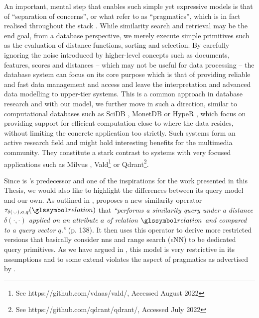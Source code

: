 An important, mental step that enables such simple yet expressive models is that of ``separation of concerns'', or what \cite{Giangreco:2018Database,Ferro:2014Bridging} refer to as ``pragmatics'', which is in fact realised throughout the \vitrivr{} stack \cite{Rossetto:2016Vitrivr,Gasser:2019Multimodal}. While similarity search and retrieval may be the end goal, from a database perspective, we merely execute simple primitives such as the evaluation of distance functions, sorting and selection. By carefully ignoring the noise introduced by higher-level concepts such as documents, features, scores and distances -- which may not be useful for data processing -- the database system can focus on its core purpose which is that of providing reliable and fast data management and access and leave the interpretation and advanced data modelling to upper-tier systems. This is a common approach in database research and with our model, we further move in such a direction, similar to computational databases such as SciDB \cite{Stonebraker:2013SciDB}, MonetDB \cite{Idreos:2012MonetDB} or HypeR \cite{Hubig:2017HyPerInsight}, which focus on providing support for efficient computation close to where the data resides, without limiting the concrete application too strictly. Such systems form an active research field \cite{Luo:2018Scalable,Blacher:2022Machine} and might hold interesting benefits for the multimedia community. They constitute a stark contrast to systems with very focused applications such as Milvus \cite{Wang:2021Milvus}, Vald\footnote{See https://github.com/vdaas/vald/, Accessed August 2022} or Qdrant\footnote{See https://github.com/qdrant/qdrant/, Accessed July 2022}.

Since \adampro \cite{Giangreco:2016Adam} is \cottontail{}'s predecessor and one of the inspirations for the work presented in this Thesis, we would also like to highlight the differences between its query model and our own. As outlined in , \cite{Giangreco:2018Database} proposes a new similarity operator $\tau_{\delta(\cdot,\cdot),a,q}(\relation)$ that \emph{``performs a similarity query under a distance $\delta(\cdot,\cdot)$ applied on an attribute $a$ of relation $\relation$ and compared to a query vector $q$.''} \cite{Giangreco:2018Database} (p. 138). It then uses this operator to derive more restricted versions that basically consider \acrshort{nns} and range search ($\epsilon$NN) to be dedicated query primitives. As we have argued in , this model is very restrictive in its assumptions and to some extend violates the aspect of pragmatics as advertised by \cite{Ferro:2014Bridging}.

